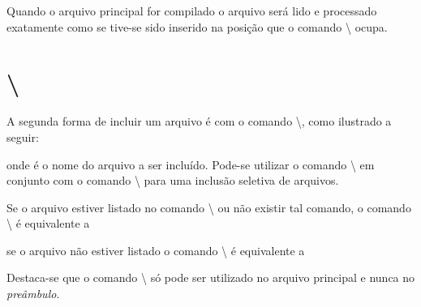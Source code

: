 Quando o arquivo principal for compilado o arquivo  será lido e processado exatamente como se tive-se sido inserido na posição que o comando \textbackslash{} ocupa.

\section{\textbackslash{}}

A segunda forma de incluir um arquivo é com o comando \textbackslash{}, como ilustrado a seguir:
\begin{latexcode}
    
\end{latexcode}
onde  é o nome do arquivo a ser incluído. Pode-se utilizar o comando \textbackslash{} em conjunto com o comando \textbackslash{} para uma inclusão seletiva de arquivos.

Se o arquivo estiver listado no comando \textbackslash{} ou não existir tal comando, o comando \textbackslash{} é equivalente a
\begin{latexcode}
    \clearpage  \clearpage
\end{latexcode}
se o arquivo não estiver listado o comando \textbackslash{} é equivalente a
\begin{latexcode}
    \clearpage
\end{latexcode}

Destaca-se que o comando \textbackslash{} só pode ser utilizado no arquivo principal e nunca no \textit{preâmbulo}.
